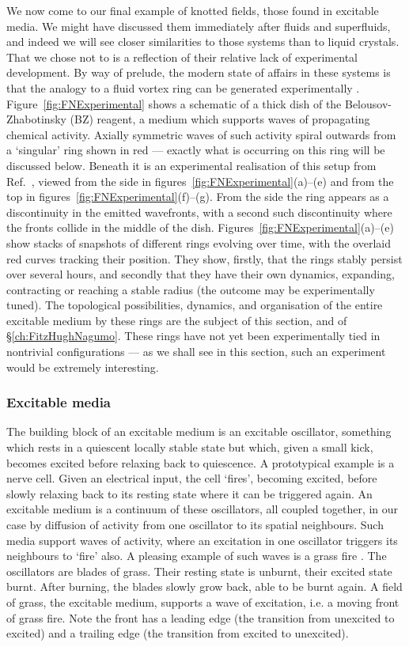 We now come to our final example of knotted fields, those found in excitable media. We might have discussed them immediately after fluids and superfluids, and indeed we will see closer similarities to those systems than to liquid crystals. That we chose not to is a reflection of their relative lack of experimental development. By way of prelude, the modern state of affairs in these systems is that the analogy to a fluid vortex ring can be generated experimentally \citep{Steinbock2006,Azhand2014, Totz2015}. Figure~\ref{fig:FNExperimental} shows a schematic of a thick dish of the Belousov-Zhabotinsky (BZ) reagent, a medium which supports waves of propagating chemical activity. Axially symmetric waves of such activity spiral outwards from a `singular' ring shown in red --- exactly what is occurring on this ring will be discussed below. Beneath it is an experimental realisation of this setup from Ref.~\citep{Totz2015}, viewed from the side in figures~\ref{fig:FNExperimental}(a)--(e) and from the top in figures~\ref{fig:FNExperimental}(f)--(g). From the side the ring appears as a discontinuity in the emitted wavefronts, with a second such discontinuity where the fronts collide in the middle of the dish. Figures~\ref{fig:FNExperimental}(a)--(e) show stacks of snapshots of different rings evolving over time, with the overlaid red curves tracking their position. They show, firstly, that the rings stably persist over several hours, and secondly that they have their own dynamics, expanding, contracting or reaching a stable radius (the outcome may be experimentally tuned). The topological possibilities, dynamics, and organisation of the entire excitable medium by these rings are the subject of this section, and of \S \ref{ch:FitzHughNagumo}. These rings have not yet been experimentally tied in nontrivial configurations --- as we shall see in this section, such an experiment would be extremely interesting.

\subsubsection{Excitable media}

The building block of an excitable medium is an excitable oscillator, something which rests in a quiescent locally stable state but which, given a small kick, becomes excited before relaxing back to quiescence. A prototypical example is a nerve cell. Given an electrical input, the cell `fires', becoming excited, before slowly relaxing back to its resting state where it can be triggered again. An excitable medium is a continuum of these oscillators, all coupled together, in our case by diffusion of activity from one oscillator to its spatial neighbours. Such media support waves of activity, where an excitation in one oscillator triggers its neighbours to `fire' also. A pleasing example of such waves is a grass fire \citep{Winfree1983}. The oscillators are blades of grass. Their resting state is unburnt, their excited state burnt. After burning, the blades slowly grow back, able to be burnt again. A field of grass, the excitable medium, supports a wave of excitation, i.e. a moving front of grass fire. Note the front has a leading edge (the transition from unexcited to excited) and a trailing edge (the transition from excited to unexcited).


